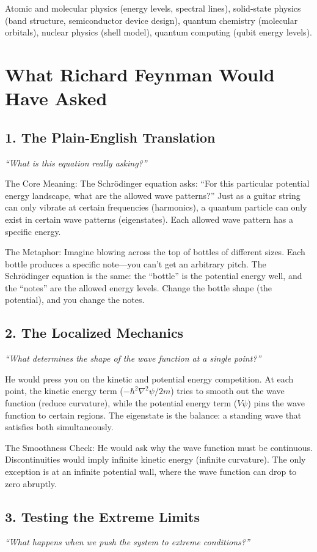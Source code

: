 \documentclass[11pt,openright]{book}
\begin{document}
Atomic and molecular physics (energy levels, spectral lines), solid-state physics (band structure, semiconductor device design), quantum chemistry (molecular orbitals), nuclear physics (shell model), quantum computing (qubit energy levels).
\section*{What Richard Feynman Would Have Asked}

\subsection*{1. The Plain-English Translation}
\textit{``What is this equation really asking?''}

The Core Meaning: The Schr\"odinger equation asks: ``For this particular potential energy landscape, what are the allowed wave patterns?'' Just as a guitar string can only vibrate at certain frequencies (harmonics), a quantum particle can only exist in certain wave patterns (eigenstates). Each allowed wave pattern has a specific energy.

The Metaphor: Imagine blowing across the top of bottles of different sizes. Each bottle produces a specific note---you can't get an arbitrary pitch. The Schr\"odinger equation is the same: the ``bottle'' is the potential energy well, and the ``notes'' are the allowed energy levels. Change the bottle shape (the potential), and you change the notes.

\subsection*{2. The Localized Mechanics}
\textit{``What determines the shape of the wave function at a single point?''}

He would press you on the kinetic and potential energy competition. At each point, the kinetic energy term ($-\hbar^2\nabla^2\psi/2m$) tries to smooth out the wave function (reduce curvature), while the potential energy term ($V\psi$) pins the wave function to certain regions. The eigenstate is the balance: a standing wave that satisfies both simultaneously.

The Smoothness Check: He would ask why the wave function must be continuous. Discontinuities would imply infinite kinetic energy (infinite curvature). The only exception is at an infinite potential wall, where the wave function can drop to zero abruptly.

\subsection*{3. Testing the Extreme Limits}
\textit{``What happens when we push the system to extreme conditions?''}
\end{document}
